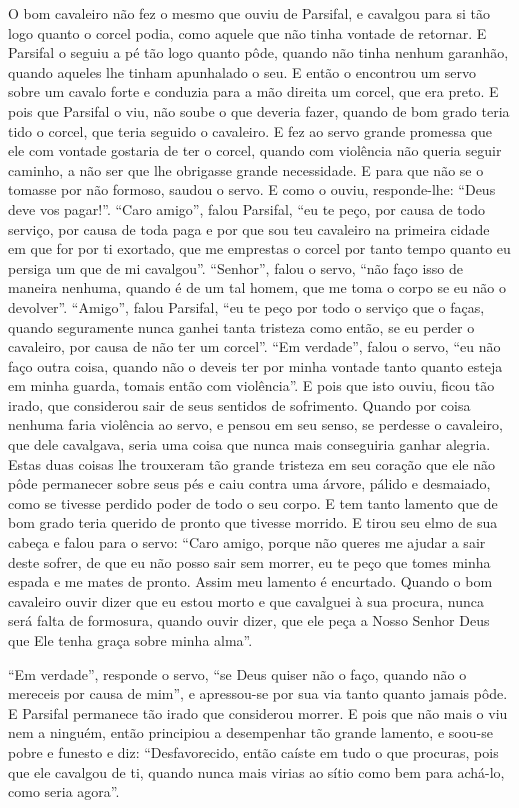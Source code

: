 O bom cavaleiro não fez o mesmo que ouviu de Parsifal, e cavalgou para si
tão logo quanto o corcel podia, como aquele que não tinha vontade de retornar.
E Parsifal o seguiu a pé tão logo quanto pôde, quando não tinha nenhum
garanhão, quando aqueles lhe tinham apunhalado o seu. E então o encontrou um
servo sobre um cavalo forte e conduzia para a mão direita um corcel, que era
preto. E pois que Parsifal o viu, não soube o que deveria fazer, quando de bom
grado teria tido o corcel, que teria seguido o cavaleiro. E fez ao servo grande
promessa que ele com vontade gostaria de ter o corcel, quando com violência não
queria seguir caminho, a não ser que lhe obrigasse grande necessidade. E para
que não se o tomasse por não formoso, saudou o servo. E como o ouviu,
responde-lhe: “Deus deve vos pagar!”. “Caro amigo”, falou Parsifal, “eu te
peço, por causa de todo serviço, por causa de toda paga e por que sou teu
cavaleiro na primeira cidade em que for por ti exortado, que me emprestas o
corcel por tanto tempo quanto eu persiga um que de mi cavalgou”.
“Senhor”, falou o servo, “não faço isso de maneira nenhuma, quando é de um tal
homem, que me toma o corpo se eu não o devolver”. “Amigo”, falou Parsifal, “eu
te peço por todo o serviço que o faças, quando seguramente nunca ganhei tanta
tristeza como então, se eu perder o cavaleiro, por causa de não ter um corcel”.
“Em verdade”, falou o servo, “eu não faço outra coisa, quando não o deveis ter
por minha vontade tanto quanto esteja em minha guarda, tomais então com
violência”. E pois que isto ouviu, ficou tão irado, que considerou sair de seus
sentidos de sofrimento. Quando por coisa nenhuma faria violência ao servo, e
pensou em seu senso, se perdesse o cavaleiro, que dele cavalgava, seria uma
coisa que nunca mais conseguiria ganhar alegria. Estas duas coisas lhe
trouxeram tão grande tristeza em seu coração que ele não pôde permanecer sobre
seus pés e caiu contra uma árvore, pálido e desmaiado, como se tivesse perdido
poder de todo o seu corpo. E tem tanto lamento que de bom grado teria querido
de pronto que tivesse morrido. E tirou seu elmo de sua cabeça e falou para o
servo: “Caro amigo, porque não queres me ajudar a sair deste sofrer, de que eu
não posso sair sem morrer, eu te peço que tomes minha espada e me mates de
pronto. Assim meu lamento é encurtado. Quando o bom cavaleiro ouvir dizer que
eu estou morto e que cavalguei à sua procura, nunca será falta de formosura,
quando ouvir dizer, que ele peça a Nosso Senhor Deus que Ele tenha graça sobre
minha alma”. 

“Em verdade”, responde o servo, “se Deus quiser não o faço, quando não o
mereceis por causa de mim”, e apressou-se por sua via tanto quanto jamais pôde.
E Parsifal permanece tão irado que considerou morrer. E pois que não mais o
viu nem a ninguém, então principiou a desempenhar tão grande lamento, e soou-se
pobre e funesto e diz: “Desfavorecido, então caíste em tudo o que procuras,
pois que ele cavalgou de ti, quando nunca mais virias ao sítio como bem para
achá-lo, como seria agora”. 


